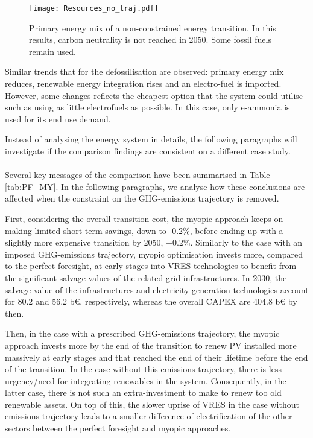  \begin{figure}[!htbp]
\centering
\texttt{[image: Resources\_no\_traj.pdf]}
\caption{Primary energy mix of a non-constrained energy transition. In this results, carbon neutrality is not reached in 2050. Some fossil fuels remain used.}
\label{fig:EnergyMixPathwayWithoutGHGLimit}
\end{figure}

Similar trends that for the defossilisation are observed: primary energy mix reduces, renewable energy integration rises and an electro-fuel is imported. However, some changes reflects the cheapest option that the system could utilise such as using as little electrofuels as possible. In this case, only e-ammonia is used for its end use demand.

Instead of analysing the energy system in details, the following paragraphs will investigate if the comparison findings are consistent on a different case study.\\

\\

\noindent
Several key messages of the comparison have been summarised in Table \ref{tab:PF_MY}. In the following paragraphs, we analyse how these conclusions are affected when the constraint on the \gls{GHG}-emissions trajectory is removed. 

First, considering the overall transition cost, the myopic approach keeps on making limited short-term savings, \ie down to -0.2\%, before ending up with a slightly more expensive transition by 2050, \ie +0.2\%. Similarly to the case with an imposed \gls{GHG}-emissions trajectory, myopic optimisation invests more, compared to the perfect foresight, at early stages into \gls{VRES} technologies to benefit from the significant salvage values of the related grid infrastructures. In 2030, the salvage value of the infrastructures and electricity-generation technologies account for 80.2 and 56.2 b€, respectively, whereas the overall CAPEX are 404.8 b€ by then.

Then, in the case with a prescribed \gls{GHG}-emissions trajectory, the myopic approach invests more by the end of the transition to renew \gls{PV} installed more massively at early stages and that reached the end of their lifetime before the end of the transition. In the case without this emissions trajectory, there is less urgency/need for integrating renewables in the system. Consequently, in the latter case, there is not such an extra-investment to make to renew too old renewable assets. On top of this, the slower uprise of \gls{VRES} in the case without emissions trajectory leads to a smaller difference of electrification of the other sectors between the perfect foresight and myopic approaches.

